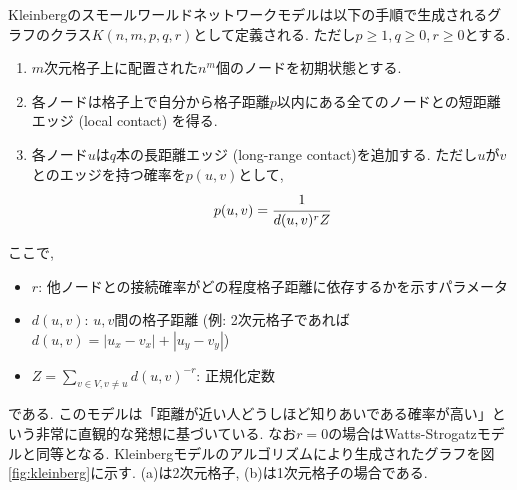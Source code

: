 \documentclass[dvipdfmx]{ampbt}
\begin{document}
   Kleinbergのスモールワールドネットワークモデルは以下の手順で生成されるグラフのクラス$K(n,m,p,q,r)$として定義される. ただし$p \geq 1, q \geq 0, r \geq 0$とする. 
   \begin{enumerate}
    \item $m$次元格子上に配置された$n^m$個のノードを初期状態とする.
    \item 各ノードは格子上で自分から格子距離$p$以内にある全てのノードとの短距離エッジ (local contact) を得る.
    \item 各ノード$u$は$q$本の長距離エッジ (long-range contact)を追加する. ただし$u$が$v$とのエッジを持つ確率を$p(u,v)$として,
	  \begin{eqnarray}
	   p(u,v)=\cfrac{1}{d(u,v)^{r}Z} \label{eq:kleinberg_p}
	  \end{eqnarray}
   \end{enumerate}
   ここで, 
   \begin{itemize}
    \item  $r$: 他ノードとの接続確率がどの程度格子距離に依存するかを示すパラメータ
    \item  $d(u,v)$: $u,v$間の格子距離 (例: 2次元格子であれば$d(u,v)=|u_x - v_x| + |u_y - v_y|$)
    \item $Z = \displaystyle \sum_{v\in V, v\neq u}^{}d(u,v)^{-r}$: 正規化定数
   \end{itemize}
   である. このモデルは「距離が近い人どうしほど知りあいである確率が高い」という非常に直観的な発想に基づいている. なお$r=0$の場合はWatts-Strogatzモデルと同等となる. Kleinbergモデルのアルゴリズムにより生成されたグラフを図\ref{fig:kleinberg}に示す. (a)は2次元格子, (b)は1次元格子の場合である.
\end{document}
